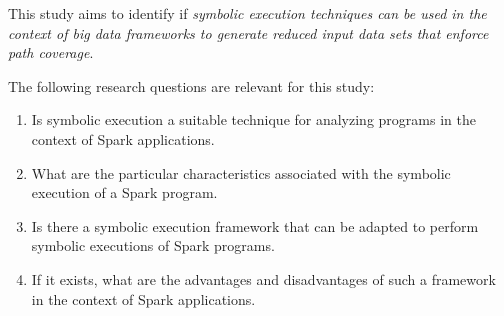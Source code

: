 \label{ch:introduction}




This study aims to identify if \textit{symbolic execution techniques can be used in the context of big data frameworks to generate reduced input data sets that enforce path coverage}.


The following research questions are relevant for this study:

\begin{enumerate}
	\item Is symbolic execution a suitable technique for analyzing programs in the context of Spark applications.
	\item What are the particular characteristics associated with the symbolic execution of a Spark program.
	\item Is there a symbolic execution framework that can be adapted to perform symbolic executions of Spark programs.
	\item If it exists, what are the advantages and disadvantages of such a framework in the context of Spark applications.	
\end{enumerate}

\label{sec:contributions}
